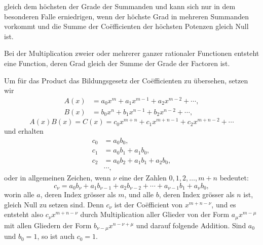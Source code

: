 \begingroup
\setlength{\abovedisplayskip}{5pt plus 2pt minus 1pt}
\setlength{\belowdisplayskip}{5pt plus 2pt minus 1pt}
\setlength{\abovedisplayshortskip}{3pt plus 1pt}
\setlength{\belowdisplayshortskip}{4pt plus 1pt}
\linespread{0.94}\selectfont
gleich dem höchsten der Grade der Summanden und kann sich nur in dem
besonderen Falle erniedrigen, wenn der höchste Grad in mehreren
Summanden vorkommt und die Summe der Coëfficienten der höchsten
Potenzen gleich Null ist.

Bei der Multiplication zweier oder mehrerer ganzer rationaler
Functionen entsteht eine Function, deren Grad gleich der Summe der
Grade der Factoren ist.

Um für das Product das Bildungsgesetz der Coëfficienten zu übersehen,
setzen wir
\begin{equation}
\begin{aligned}
 A(x)&=a_0x^m+a_1x^{m-1}+a_2x^{m-2}+\cdots,\\
 B(x)&=b_0x^n+b_1x^{n-1}+b_2x^{n-2}+\cdots,
\end{aligned}
\tag{2}
\end{equation}
\begin{equation}
 A(x)B(x)=C(x)=c_0x^{m+n}+c_1x^{m+n-1}+c_2x^{m+n-2}+\cdots
\tag{3}
\end{equation}
und erhalten
\[
\begin{aligned}
 c_0&=a_0b_0,\\
 c_1&=a_0b_1+a_1b_0,\\
 c_2&=a_0b_2+a_1b_1+a_2b_0,\\
 &\cdots,
\end{aligned}
\]
oder in allgemeinen Zeichen, wenn $\nu$ eine der Zahlen
$0,1,2,\ldots,m+n$ bedeutet:
\begin{equation}
 c_\nu=a_0b_\nu+a_1b_{\nu-1}+a_2b_{\nu-2}+\cdots
       +a_{\nu-1}b_1+a_\nu b_0,
\tag{4}
\end{equation}
worin alle $a$, deren Index grösser als $m$, und alle $b$, deren Index
grösser als $n$ ist, gleich Null zu setzen sind. Denn $c_\nu$ ist der
Coëfficient von $x^{m+n-\nu}$, und es entsteht also
$c_\nu x^{m+n-\nu}$ durch Multiplication aller Glieder von der Form
$a_\mu x^{m-\mu}$ mit allen Gliedern der Form
$b_{\nu-\mu}x^{n-\nu+\mu}$ und darauf folgende Addition. Sind $a_0$
und $b_0=1$, so ist auch $c_0=1$.%


